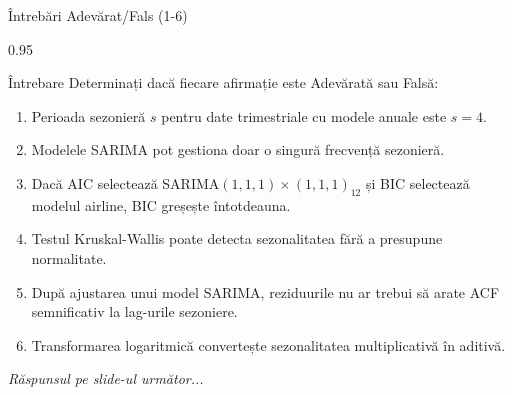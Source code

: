 \documentclass[9pt, aspectratio=169, t]{beamer}
\begin{document}
\begin{frame}{Întrebări Adevărat/Fals (1-6)}
    \begin{cminipage}{0.95\textwidth}
    \begin{alertblock}{Întrebare}
        Determinați dacă fiecare afirmație este Adevărată sau Falsă:
    \end{alertblock}

    \vspace{0.3cm}
    {\small
    \begin{enumerate}\setlength{\itemsep}{0pt}
        \item Perioada sezonieră $s$ pentru date trimestriale cu modele anuale este $s=4$.
        \item Modelele SARIMA pot gestiona doar o singură frecvență sezonieră.
        \item Dacă AIC selectează SARIMA$(1,1,1) \times (1,1,1)_{12}$ și BIC selectează modelul airline, BIC greșește întotdeauna.
        \item Testul Kruskal-Wallis poate detecta sezonalitatea fără a presupune normalitate.
        \item După ajustarea unui model SARIMA, reziduurile nu ar trebui să arate ACF semnificativ la lag-urile sezoniere.
        \item Transformarea logaritmică convertește sezonalitatea multiplicativă în aditivă.
    \end{enumerate}
    }

    \vspace{0.3cm}
    \begin{center}
        \textit{Răspunsul pe slide-ul următor...}
    \end{center}
    \end{cminipage}
\end{frame}
\end{document}
